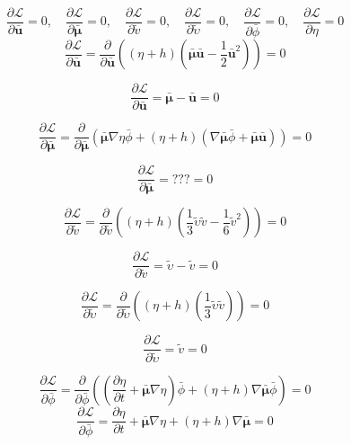 \[
\frac{\partial \mathscr{L}}{\partial \bar{\bm{u}}} = 0
,\quad
\frac{\partial \mathscr{L}}{\partial \bar{\bm{\mu}}} = 0
,\quad
\frac{\partial \mathscr{L}}{\partial \tilde{v}} = 0
,\quad
\frac{\partial \mathscr{L}}{\partial \tilde{\upsilon}} = 0
,\quad
\frac{\partial \mathscr{L}}{\partial \bar{\phi}} = 0
,\quad
\frac{\partial \mathscr{L}}{\partial \eta} = 0
\]
\[
\frac{\partial \mathscr{L}}{\partial \bar{\bm{u}}}
=
\frac{\partial \mathscr{}}{\partial \bar{\bm{u}}}\left((\eta + h) (\bar{\bm{\mu}}\bar{\bm{u}} - \frac{1}{2} \bar{\bm{u}}^2)\right)
= 0
\]

\begin{equation}
	\frac{\partial \mathscr{L}}{\partial \bar{\bm{u}}}
	=
	\bar{\bm{\mu}} - \bar{\bm{u}}
	= 0
	\label{luke:Variation_nach_u}
\end{equation}

\[
\frac{\partial \mathscr{L}}{\partial \bar{\bm{\mu}}}
=
\frac{\partial \mathscr{}}{\partial \bar{\bm{\mu}}} \left( \bar{\bm{\mu}} \nabla \eta \bar{\phi}+(\eta + h) (\nabla \bar{\bm{\mu}}\bar{\phi}+\bar{\bm{\mu}}\bar{\bm{u}}) \right)
= 0
\]

\begin{equation}
	\frac{\partial \mathscr{L}}{\partial \bar{\bm{\mu}}}
	=
	???
	= 0
	\label{luke:Variation_nach_mu}
\end{equation}

\[
\frac{\partial \mathscr{L}}{\partial \tilde{v}}
=
\frac{\partial \mathscr{}}{\partial \tilde{v}}\left((\eta + h) (\frac{1}{3} \tilde{\upsilon}\tilde{v} - \frac{1}{6} \tilde{v}^2)\right)
= 0
\]

\begin{equation}
	\frac{\partial \mathscr{L}}{\partial \tilde{v}}
	=
	\tilde{\upsilon}-\tilde{v}
	= 0
	\label{luke:Variation_nach_v}
\end{equation}

\[
\frac{\partial \mathscr{L}}{\partial \tilde{\upsilon}}
=
\frac{\partial \mathscr{}}{\partial \tilde{\upsilon}}\left((\eta + h) (\frac{1}{3} \tilde{\upsilon}\tilde{v})\right)
= 0
\]

\begin{equation}
	\frac{\partial \mathscr{L}}{\partial \tilde{\upsilon}}
	=
	\tilde{v}
	= 0
	\label{luke:Variation_nach_upsilon}
\end{equation}

\[
\frac{\partial \mathscr{L}}{\partial \bar{\phi}}
=
\frac{\partial \mathscr{}}{\partial \bar{\phi}}\left( (\frac{\partial \eta}{\partial t} + \bar{\bm{\mu}} \nabla \eta) \bar{\phi} + (\eta + h) \nabla \bar{\bm{\mu}}\bar{\phi}\right)
= 0
\]
\begin{equation}
	\frac{\partial \mathscr{L}}{\partial \bar{\phi}}
	=
	\frac{\partial \eta}{\partial t} + \bar{\bm{\mu}} \nabla \eta + (\eta + h) \nabla \bar{\bm{\mu}}
	= 0
	\label{luke:Variation_nach_phi}
\end{equation}

